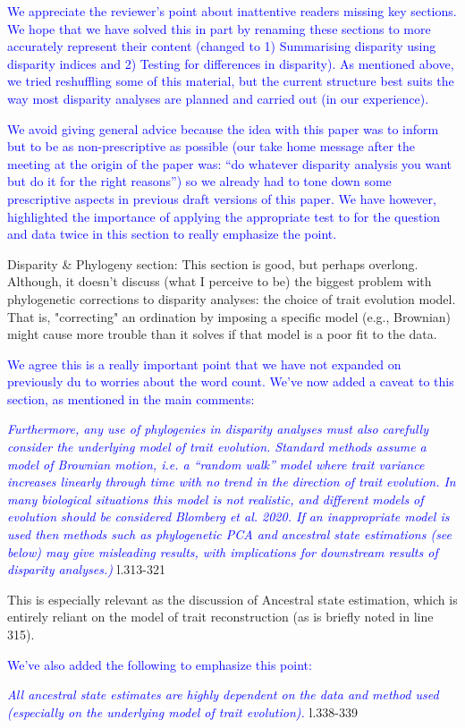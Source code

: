 \documentclass[12pt,letterpaper]{article}
\begin{document}
\textcolor{blue}{We appreciate the reviewer's point about inattentive readers missing key sections. We hope that we have solved this in part by renaming these sections to more accurately represent their content (changed to 1) Summarising disparity using disparity indices and 2) Testing for differences in disparity). As mentioned above, we tried reshuffling some of this material, but the current structure best suits the way most disparity analyses are planned and carried out (in our experience).} 

\textcolor{blue}{We avoid giving general advice because the idea with this paper was to inform but to be as non-prescriptive as possible (our take home message after the meeting at the origin of the paper was: ``do whatever disparity analysis you want but do it for the right reasons'') so we already had to tone down some prescriptive aspects in previous draft versions of this paper. We have however, highlighted the importance of applying the appropriate test to for the question and data twice in this section to really emphasize the point.}

\noindent Disparity \& Phylogeny section: This section is good, but perhaps overlong. Although, it doesn't discuss (what I perceive to be) the biggest problem with phylogenetic corrections to disparity analyses: the choice of trait evolution model.
That is, "correcting" an ordination by imposing a specific model (e.g., Brownian) might cause more trouble than it solves if that model is a poor fit to the data.

\textcolor{blue}{We agree this is a really important point that we have not expanded on previously du to worries about the word count. We've now added a caveat to this section, as mentioned in the main comments:}

\textcolor{blue}{\textit{Furthermore, any use of phylogenies in disparity analyses must also carefully consider the underlying model of trait evolution. Standard methods assume a model of Brownian motion, i.e. a ``random walk'' model where trait variance increases linearly through time with no trend in the direction of trait evolution. In many biological situations this model is not realistic, and different models of evolution should be considered Blomberg et al. 2020. If an inappropriate model is used then methods such as phylogenetic PCA and ancestral state estimations (see below) may give misleading results, with implications for downstream results of disparity analyses.)}} l.313-321 %

\noindent This is especially relevant as the discussion of Ancestral state estimation, which is entirely reliant on the model of trait reconstruction (as is briefly noted in line 315).

\textcolor{blue}{We've also added the following to emphasize this point:}

\textcolor{blue}{\textit{All ancestral state estimates are highly dependent on the data and method used (especially on the underlying model of trait evolution).}} l.338-339 %
\end{document}
